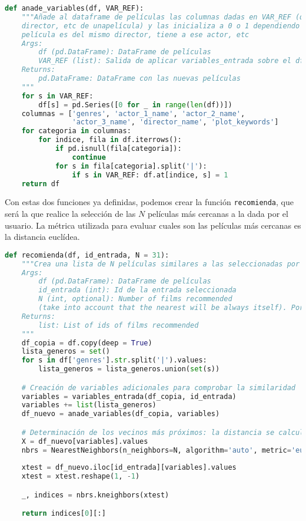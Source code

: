 \begin{lstlisting}[language=Python, caption= {Creación de la matriz de coordenadas de las películas. Para ello, se hace uso de la función definida en el \autoref{lst:variablesfila}. Además, se añaden los valores de los géneros de la película.}]
def anade_variables(df, VAR_REF):
    """Añade al dataframe de películas las columnas dadas en VAR_REF (que serán el 
    director, etc de unapelícula) y las inicializa a 0 o 1 dependiendo de si la 
    película es del mismo director, tiene a ese actor, etc
    Args:
        df (pd.DataFrame): DataFrame de películas
        VAR_REF (list): Salida de aplicar variables_entrada sobre el df y una película
    Returns:
        pd.DataFrame: DataFrame con las nuevas películas
    """
    for s in VAR_REF: 
        df[s] = pd.Series([0 for _ in range(len(df))])
    columnas = ['genres', 'actor_1_name', 'actor_2_name',
                'actor_3_name', 'director_name', 'plot_keywords']
    for categoria in columnas:
        for indice, fila in df.iterrows():
            if pd.isnull(fila[categoria]):
                continue
            for s in fila[categoria].split('|'):
                if s in VAR_REF: df.at[indice, s] = 1            
    return df
\end{lstlisting}

Con estas dos funciones ya definidas, podemos crear la función \texttt{recomienda}, que será la que realice la selección de las $N$ películas más cercanas a la dada por el usuario. La métrica utilizada para evaluar cuales son las películas más cercanas es la distancia euclídea.

\begin{lstlisting}[language=Python, caption= {Obtención de las 30 mejores películas dada una por el usuario.}]
def recomienda(df, id_entrada, N = 31):
    """Crea una lista de N películas similares a las seleccionadas por el usuario
    Args:
        df (pd.DataFrame): DataFrame de películas
        id_entrada (int): Id de la entrada seleccionada
        N (int, optional): Number of films recommended 
        (take into account that the nearest will be always itself). Por defecto 31.
    Returns:
        list: List of ids of films recommended
    """
    df_copia = df.copy(deep = True)    
    lista_generos = set()
    for s in df['genres'].str.split('|').values:
        lista_generos = lista_generos.union(set(s))    

    # Creación de variables adicionales para comprobar la similaridad
    variables = variables_entrada(df_copia, id_entrada)
    variables += list(lista_generos)
    df_nuevo = anade_variables(df_copia, variables)

    # Determinación de los vecinos más próximos: la distancia se calcula con las nuevas vairables
    X = df_nuevo[variables].values
    nbrs = NearestNeighbors(n_neighbors=N, algorithm='auto', metric='euclidean').fit(X)
    
    xtest = df_nuevo.iloc[id_entrada][variables].values
    xtest = xtest.reshape(1, -1)

    _, indices = nbrs.kneighbors(xtest)

    return indices[0][:]
\end{lstlisting}

